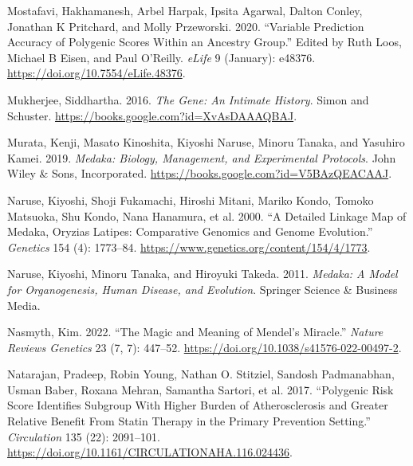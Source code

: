 \documentclass[
]{book}
\newlength{\cslhangindent}
\newlength{\cslentryspacingunit} %
\newenvironment{CSLReferences}[2] %
 {%
  \setlength{\parindent}{0pt}
  \ifodd #1
  \let\oldpar\par
  \def\par{\hangindent=\cslhangindent\oldpar}
  \fi
  \setlength{\parskip}{#2\cslentryspacingunit}
 }%
 {}
\begin{document}
\begin{CSLReferences}{1}{0}
\leavevmode{}%
Mostafavi, Hakhamanesh, Arbel Harpak, Ipsita Agarwal, Dalton Conley, Jonathan K Pritchard, and Molly Przeworski. 2020. {``Variable Prediction Accuracy of Polygenic Scores Within an Ancestry Group.''} Edited by Ruth Loos, Michael B Eisen, and Paul O'Reilly. \emph{eLife} 9 (January): e48376. \url{https://doi.org/10.7554/eLife.48376}.

\leavevmode{}%
Mukherjee, Siddhartha. 2016. \emph{The {Gene}: {An Intimate History}}. {Simon and Schuster}. \url{https://books.google.com?id=XvAsDAAAQBAJ}.

\leavevmode{}%
Murata, Kenji, Masato Kinoshita, Kiyoshi Naruse, Minoru Tanaka, and Yasuhiro Kamei. 2019. \emph{Medaka: {Biology}, {Management}, and {Experimental Protocols}}. {John Wiley \& Sons, Incorporated}. \url{https://books.google.com?id=V5BAzQEACAAJ}.

\leavevmode{}%
Naruse, Kiyoshi, Shoji Fukamachi, Hiroshi Mitani, Mariko Kondo, Tomoko Matsuoka, Shu Kondo, Nana Hanamura, et al. 2000. {``A {Detailed Linkage Map} of {Medaka}, {Oryzias} Latipes: {Comparative Genomics} and {Genome Evolution}.''} \emph{Genetics} 154 (4): 1773--84. \url{https://www.genetics.org/content/154/4/1773}.

\leavevmode{}%
Naruse, Kiyoshi, Minoru Tanaka, and Hiroyuki Takeda. 2011. \emph{Medaka: A Model for Organogenesis, Human Disease, and Evolution}. {Springer Science \& Business Media}.

\leavevmode{}%
Nasmyth, Kim. 2022. {``The Magic and Meaning of {Mendel}'s Miracle.''} \emph{Nature Reviews Genetics} 23 (7, 7): 447--52. \url{https://doi.org/10.1038/s41576-022-00497-2}.

\leavevmode{}%
Natarajan, Pradeep, Robin Young, Nathan O. Stitziel, Sandosh Padmanabhan, Usman Baber, Roxana Mehran, Samantha Sartori, et al. 2017. {``Polygenic {Risk Score Identifies Subgroup With Higher Burden} of {Atherosclerosis} and {Greater Relative Benefit From Statin Therapy} in the {Primary Prevention Setting}.''} \emph{Circulation} 135 (22): 2091--101. \url{https://doi.org/10.1161/CIRCULATIONAHA.116.024436}.


\end{CSLReferences}
\end{document}
